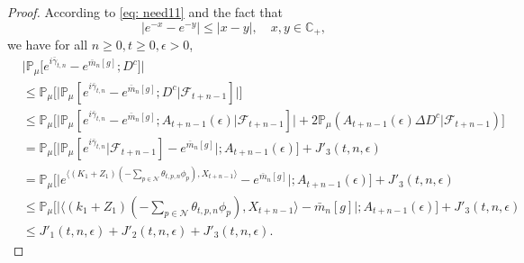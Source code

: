 \documentclass[12pt,a4paper]{amsart}
\theoremstyle{plain}
\theoremstyle{definition}
\numberwithin{equation}{section}
\begin{document}
\begin{proof}
 According to \eqref{eq: need11} and the fact that
\[
	|e^{-x} - e^{-y}| \leq |x-y|,\quad x,y \in \mathbb C_+,
\]
we have for all $n\geq 0, t\geq 0, \epsilon> 0$, 
\begin{align}
\label{eq: inequality that will used later1}
    &\big|\mathbb{P}_{\mu}\big[e^{i\bar{\gamma}_{t,n}}-e^{\bar{m}_n[g]}; D^c\big]\big|
    \\& \leq \mathbb{P}_{\mu}\Big[\big| \mathbb{P}_{\mu}[e^{i\bar{\gamma}_{t,n}}-e^{\bar{m}_n[g]}; D^c | \mathscr F_{t+n-1}]\big|\Big]
    \\& \leq \mathbb{P}_{\mu}\Big[\big| \mathbb{P}_{\mu}[e^{i\bar{\gamma}_{t,n}}-e^{\bar{m}_n[g]}; A_{t+n-1}(\epsilon)| \mathscr F_{t+n-1}]\big| + 2\mathbb P_\mu(A_{t+n-1}(\epsilon) \Delta D^c| \mathscr F_{t+n-1})\Big]
    \\& = \mathbb{P}_{\mu}\Big[ \big|\mathbb{P}_{\mu}[e^{i\bar{\gamma}_{t,n}}| \mathscr F_{t+n-1}]-e^{\bar{m}_n[g]}\big|;A_{t+n-1}(\epsilon)\Big] + J'_3(t,n,\epsilon)
    \\&=\mathbb{P}_{\mu}\Big[\big|e^{\langle (K_1+Z_1)(-\sum_{p\in \mathcal{N}}\theta_{t,p,n}\phi_p), X_{t+n-1}\rangle}-e^{\bar{m}_n[g]}\big|;A_{t+n-1}(\epsilon)\Big]+ J'_3(t,n,\epsilon)
    \\&\leq \mathbb{P}_{\mu}\Big[\big|\langle (k_1+Z_1)(-\sum_{p\in \mathcal{N}}\theta_{t,p,n}\phi_p), X_{t+n-1}\rangle-\bar{m}_n[g]\big|;A_{t+n-1}(\epsilon)\Big]+ J'_3(t,n,\epsilon)
    \\&\leq J'_1(t,n,\epsilon)+J'_2(t,n,\epsilon)+J'_3(t,n,\epsilon).
\end{align}


\end{proof}
\end{document}
